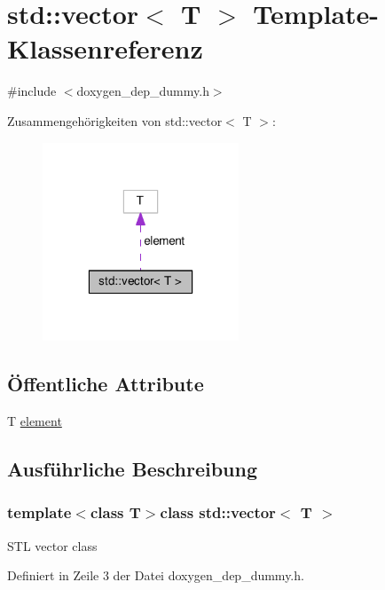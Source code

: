 \hypertarget{classstd_1_1vector}{\section{std\-:\-:vector$<$ T $>$ Template-\/\-Klassenreferenz}
\label{classstd_1_1vector}
}


{\ttfamily \#include $<$doxygen\-\_\-dep\-\_\-dummy.\-h$>$}



Zusammengehörigkeiten von std\-:\-:vector$<$ T $>$\-:\nopagebreak
\begin{figure}[H]
\begin{center}
\leavevmode
\includegraphics[width=166pt]{classstd_1_1vector__coll__graph}
\end{center}
\end{figure}
\subsection*{Öffentliche Attribute}
\begin{DoxyCompactItemize}
\item 
T \hyperlink{classstd_1_1vector_aa4413180f775cf542ab040103fb94438}{element}
\end{DoxyCompactItemize}


\subsection{Ausführliche Beschreibung}
\subsubsection*{template$<$class T$>$class std\-::vector$<$ T $>$}

S\-T\-L vector class 

Definiert in Zeile 3 der Datei doxygen\-\_\-dep\-\_\-dummy.\-h.




